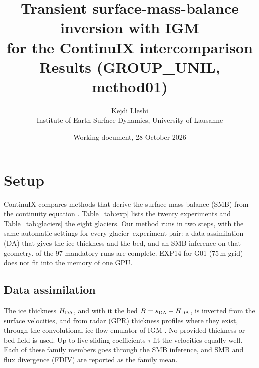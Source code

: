 \documentclass[10pt,a4paper]{article}
\title{\textbf{Transient surface-mass-balance inversion with IGM\\for the ContinuIX intercomparison}\\[4pt]
\large Results (GROUP\_UNIL, method01)}
\author{Kejdi Lleshi\\ \small Institute of Earth Surface Dynamics, University of Lausanne}
\date{\small Working document, 28 October 2026}
\begin{document}
\maketitle

\section{Setup}
ContinuIX compares methods that derive the surface mass balance (SMB) from the continuity equation
\citep{continuix}. Table~\ref{tab:exp} lists the twenty experiments and Table~\ref{tab:glaciers} the eight glaciers.
Our method runs in two steps, with the same automatic settings for every glacier--experiment pair:
a data assimilation (DA) that gives the ice thickness and the bed, and an SMB inference on that geometry.
 of the 97 mandatory runs are complete. EXP14 for G01 (75\,m grid) does not fit into the memory of one GPU.

\subsection{Data assimilation}
The ice thickness $H_{\rm DA}$, and with it the bed $B=s_{\rm DA}-H_{\rm DA}$, is inverted from the surface velocities, and
from radar (GPR) thickness profiles where they exist, through the convolutional ice-flow emulator of IGM \citep{igm}. No
provided thickness or bed field is used. Up to five sliding coefficients $\tau$ fit the velocities equally well. Each of
these family members goes through the SMB inference, and SMB and flux divergence (FDIV) are reported as the family mean.
\end{document}
